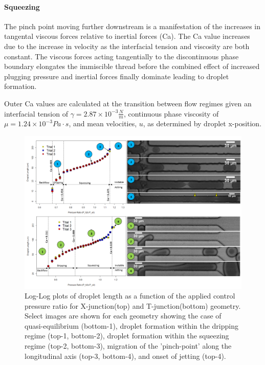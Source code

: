 \paragraph{Squeezing}

The pinch point moving further downstream is a manifestation of the increases in tangental viscous forces relative to inertial forces (Ca). The Ca value increases due to the increase in velocity as the interfacial tension and viscosity are both constant. The viscous forces acting tangentially to the discontinuous phase boundary elongates the immiscible thread before the combined effect of increased plugging pressure and inertial forces finally dominate leading to droplet formation.

Outer Ca values are calculated at the transition between flow regimes given an interfacial tension of $\gamma = 2.87 \times 10^{-3}\frac{N}{m}$, continuous phase viscosity of $\mu = 1.24 \times 10^{-3} Pa \cdot s$, and mean velocities, $u$, as determined by droplet x-position.

\begin{figure}
\centering 
\includegraphics[width=01.0\columnwidth]{regimes.PNG} 
\caption[Droplet Length as a Function of Applied Control Pressure Ratio]{Log-Log plots of droplet length as a function of the applied control pressure ratio for X-junction(top) and T-junction(bottom) geometry. Select images are shown for each geometry showing the case of quasi-equilibrium (bottom-1), droplet formation within the dripping regime (top-1, bottom-2), droplet formation within the squeezing regime (top-2, bottom-3), migration of the 'pinch-point' along the longitudinal axis (top-3, bottom-4), and onset of jetting (top-4).} 
\label{fig:regimes} 
\end{figure}




